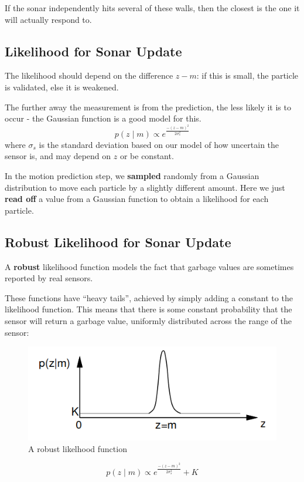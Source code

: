 \documentclass[11pt]{article}
\begin{document}
If the sonar independently hits several of these walls, then the closest is the one it will actually respond to.

\subsection{Likelihood for Sonar Update}
The likelihood should depend on the difference $z - m$: if this is small, the particle is validated, else it is weakened.

The further away the measurement is from the prediction, the less likely it is to occur - the Gaussian function is a good model for this.
\[
  p(z \mid m) \propto e^{\frac{-(z - m)^2}{2 \sigma^2_s}}
\]
where $\sigma_s$ is the standard deviation based on our model of how uncertain the sensor is, and may depend on $z$ or be constant.

In the motion prediction step, we \textbf{sampled} randomly from a Gaussian distribution to move each particle by a slightly different amount.
Here we just \textbf{read off} a value from a Gaussian function to obtain a likelihood for each particle.

\subsection{Robust Likelihood for Sonar Update}
A \textbf{robust} likelihood function models the fact that garbage values are sometimes reported by real sensors.

These functions have ``heavy tails'', achieved by simply adding a constant to the likelihood function.
This means that there is some constant probability that the sensor will return a garbage value, uniformly distributed across the range of the sensor:

\begin{figure}[h]
  \caption{A robust likelhood function}
  \includegraphics[scale=0.4]{robust}
  \centering
\end{figure}

\[
  p(z \mid m) \propto e^{\frac{-(z - m)^2}{2 \sigma^2_s}} + K
\]
\end{document}
